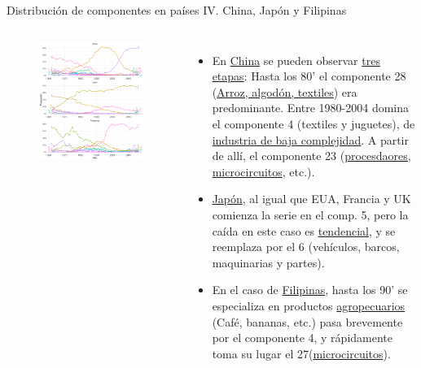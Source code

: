 \documentclass[compress]{beamer}
\begin{document}
\begin{frame}
\small
Distribución de componentes en países IV. China, Japón y Filipinas
\scriptsize
\begin{columns}[c] 

\begin{figure}
\includegraphics[width=\linewidth]{graficoLDA_k30_CHN_JPN_PHL}
\end{figure}


\begin{itemize}[label=\faRebel]
\item En \underline{China} se pueden observar \underline{tres etapas}: Hasta los 80' el componente 28 (\underline{Arroz, algodón, textiles}) era predominante. Entre 1980-2004 domina el componente 4 (textiles y juguetes), de \underline{industria de baja complejidad}. A partir de allí, el componente 23 (\underline{procesdaores, microcircuitos}, etc.). 
\item\underline{ Japón}, al igual que EUA, Francia y UK comienza la serie en el comp. 5, pero la caída en este caso es \underline{tendencial}, y se reemplaza por el 6 (vehículos, barcos, maquinarias y partes). 
\item En el caso de \underline{Filipinas}, hasta los 90' se especializa en productos \underline{agropecuarios} (Café, bananas, etc.) pasa brevemente por el componente 4, y rápidamente toma su lugar el 27(\underline{microcircuitos}).
\end{itemize}


\end{columns}
\end{frame}
\end{document}
